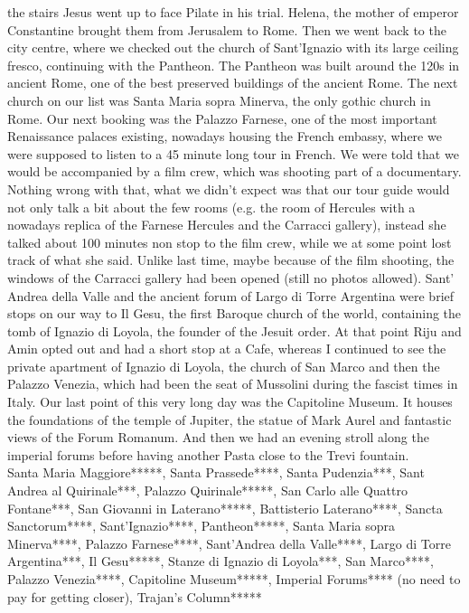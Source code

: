 the stairs Jesus went up to face Pilate in his trial. Helena, the mother of emperor Constantine brought them from Jerusalem to Rome. Then we went back to the city centre, where we checked out the church of Sant'Ignazio with its large ceiling fresco, continuing with the Pantheon. The Pantheon was built around the 120s in ancient Rome, one of the best preserved buildings of the ancient Rome. The next church on our list was Santa Maria sopra Minerva, the only gothic church in Rome. Our next booking was the Palazzo Farnese, one of the most important Renaissance palaces existing, nowadays housing the French embassy, where we were supposed to listen to a 45 minute long tour in French. We were told that we would be accompanied by a film crew, which was shooting part of a documentary. Nothing wrong with that, what we didn't expect was that our tour guide would not only talk a bit about the few rooms (e.g. the room of Hercules with a nowadays replica of the Farnese Hercules and the Carracci gallery), instead she talked about 100 minutes non stop to the film crew, while we at some point lost track of what she said. Unlike last time, maybe because of the film shooting, the windows of the Carracci gallery had been opened (still no photos allowed). Sant' Andrea della Valle and the ancient forum of Largo di Torre Argentina were brief stops on our way to Il Gesu, the first Baroque church of the world, containing the tomb of Ignazio di Loyola, the founder of the Jesuit order. At that point Riju and Amin opted out and had a short stop at a Cafe, whereas I continued to see the private apartment of Ignazio di Loyola, the church of San Marco and then the Palazzo Venezia, which had been the seat of Mussolini during the fascist times in Italy. Our last point of this very long day was the Capitoline Museum. It houses the foundations of the temple of Jupiter, the statue of Mark Aurel and fantastic views of the Forum Romanum. And then we had an evening stroll along the imperial forums before having another Pasta close to the Trevi fountain. \\

Santa Maria Maggiore*****, Santa Prassede****, Santa Pudenzia***, Sant Andrea al Quirinale***,  Palazzo Quirinale*****, San Carlo alle Quattro Fontane***,  San Giovanni in Laterano*****,  Battisterio Laterano****, Sancta Sanctorum****,  Sant'Ignazio****,  Pantheon*****,  Santa Maria sopra Minerva****,  Palazzo Farnese****,  Sant'Andrea della Valle****,  Largo di Torre Argentina***, Il Gesu*****,  Stanze di Ignazio di Loyola***,  San Marco****,  Palazzo Venezia****,  Capitoline Museum*****, Imperial Forums**** (no need to pay for getting closer),  Trajan's Column*****\\

